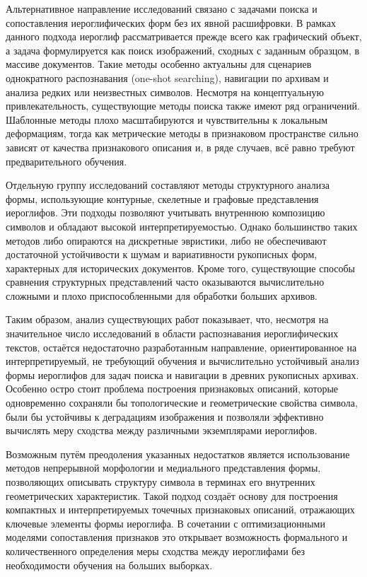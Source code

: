 Альтернативное направление исследований связано с задачами поиска и сопоставления иероглифических форм без их явной расшифровки. В рамках данного подхода иероглиф рассматривается прежде всего как графический объект, а задача формулируется как поиск изображений, сходных с заданным образцом, в массиве документов. Такие методы особенно актуальны для сценариев однократного распознавания (one-shot searching), навигации по архивам и анализа редких или неизвестных символов. Несмотря на концептуальную привлекательность, существующие методы поиска также имеют ряд ограничений. Шаблонные методы плохо масштабируются и чувствительны к локальным деформациям, тогда как метрические методы в признаковом пространстве сильно зависят от качества признакового описания и, в ряде случаев, всё равно требуют предварительного обучения.

Отдельную группу исследований составляют методы структурного анализа формы, использующие контурные, скелетные и графовые представления иероглифов. Эти подходы позволяют учитывать внутреннюю композицию символов и обладают высокой интерпретируемостью. Однако большинство таких методов либо опираются на дискретные эвристики, либо не обеспечивают достаточной устойчивости к шумам и вариативности рукописных форм, характерных для исторических документов. Кроме того, существующие способы сравнения структурных представлений часто оказываются вычислительно сложными и плохо приспособленными для обработки больших архивов.

Таким образом, анализ существующих работ показывает, что, несмотря на значительное число исследований в области распознавания иероглифических текстов, остаётся недостаточно разработанным направление, ориентированное на интерпретируемый, не требующий обучения и вычислительно устойчивый анализ формы иероглифов для задач поиска и навигации в древних рукописных архивах. Особенно остро стоит проблема построения признаковых описаний, которые одновременно сохраняли бы топологические и геометрические свойства символа, были бы устойчивы к деградациям изображения и позволяли эффективно вычислять меру сходства между различными экземплярами иероглифов.

Возможным путём преодоления указанных недостатков является использование методов непрерывной морфологии и медиального представления формы, позволяющих описывать структуру символа в терминах его внутренних геометрических характеристик. Такой подход создаёт основу для построения компактных и интерпретируемых точечных признаковых описаний, отражающих ключевые элементы формы иероглифа. В сочетании с оптимизационными моделями сопоставления признаков это открывает возможность формального и количественного определения меры сходства между иероглифами без необходимости обучения на больших выборках.

